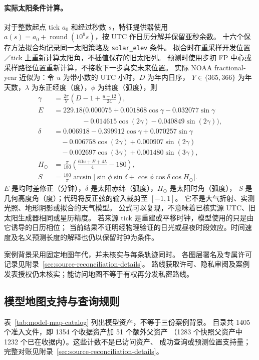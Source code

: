 \documentclass[UTF8,11pt]{ctexart}
\begin{document}
\paragraph{实际太阳条件计算。}
对于整数起点 tick \(a_0\) 和经过秒数 \(s\)，特征提供器使用
\(a(s)=a_0+\operatorname{round}(10^9s)\)，按 UTC 作日历分解并保留亚秒余数。
十六个保存方法拟合均记录同一太阳策略及 \texttt{solar\_elev} 条件。
拟合时在重采样开发位置／tick 上重新计算太阳角，不插值保存的旧太阳列。
预测时使用步初 FP 中心或采样路径位置重新计算，不接收下一步真实未来位置。
实际 NOAA fractional-year 近似为\cite{noaa}：令 \(u\) 为带小数的 UTC 小时，\(D\) 为年内日序，
\(Y\in\{365,366\}\) 为年天数，\(\lambda\) 为东正经度（度），\(\phi\) 为纬度（弧度），则
\begin{align}
\gamma&=\frac{2\pi}{Y}\left(D-1+\frac{u-12}{24}\right),\nonumber\\
E&=229.18\bigl(0.000075+0.001868\cos\gamma-0.032077\sin\gamma\nonumber\\
 &\hspace{4em}-0.014615\cos(2\gamma)-0.040849\sin(2\gamma)\bigr),\nonumber\\
\delta&=0.006918-0.399912\cos\gamma+0.070257\sin\gamma\nonumber\\
 &\quad-0.006758\cos(2\gamma)+0.000907\sin(2\gamma)\nonumber\\
 &\quad-0.002697\cos(3\gamma)+0.001480\sin(3\gamma),\nonumber\\
H_\odot&=\frac{\pi}{180}\left(\frac{60u+E+4\lambda}{4}-180\right),\nonumber\\
S&=\frac{180}{\pi}\arcsin\bigl[\sin\phi\sin\delta+
          \cos\phi\cos\delta\cos H_\odot\bigr].
\label{eq:solar-condition}
\end{align}
\(E\) 是均时差修正（分钟），\(\delta\) 是太阳赤纬（弧度），\(H_\odot\) 是太阳时角（弧度），
\(S\) 是几何高度角（度）；代码将反正弦的输入裁剪至 \([-1,1]\)。
它不是大气折射、实测光照、地形阴影或拟合的天气模型。
公式可以复现，不意味着已核实源 UTC、旧太阳生成器相同或星历精度。
若来源 tick 是重建或平移时钟，模型使用的只是由它诱导的日历相位；
当前结果不证明经物理验证的日光或昼夜时段效应。时间速度及名义预测长度的解释也仍以保留时钟为条件。

案例背景采用固定地图年代，并未核实与每条轨迹同时。
各图层署名及专属许可记录见附录~\ref{sec:source-reconciliation-details}。
路线获取许可、隐私审阅及案例发表授权仍未核实；能访问地图不等于有权再分发私密路线。

\subsection{模型地图支持与查询规则}
\label{sec:model-map-support}
表~\ref{tab:model-map-catalog} 列出模型资产，不等于三份案例背景。
目录共 1405 个准入文件，即 1354 个收据资产加 51 个额外父资产
（1283 个快照父资产中 1232 个已在收据内）。这些计数不是已访问资产、
成功查询或预测位置支持量；完整对账见附录~\ref{sec:source-reconciliation-details}。
\end{document}
